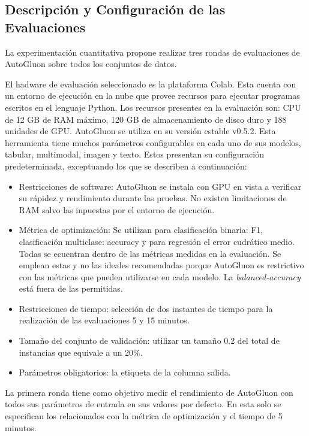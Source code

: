 \subsection{Descripción y Configuración de las Evaluaciones}\label{subsection:seetings}

La experimentación cuantitativa propone realizar tres rondas de evaluaciones de AutoGluon sobre todos los conjuntos de datos.

El hadware de evaluación seleccionado es la plataforma Colab. Esta cuenta con un entorno de ejecución en la nube que provee recursos para ejecutar programas 
escritos en el lenguaje Python. Los recursos presentes en la evaluación son: CPU de 12 GB de RAM máximo, 120 GB de almacenamiento de disco duro y 188 unidades de GPU.
AutoGluon se utiliza en su versión estable v0.5.2. Esta herramienta tiene muchos parámetros configurables en cada uno de sus modelos, tabular, multimodal, imagen y texto. 
Estos presentan su configuración predeterminada, exceptuando los que se describen a continuación:

\begin{itemize}
    \item Restricciones de software: AutoGluon se instala con GPU en vista a verificar su rápidez y rendimiento durante las pruebas. No existen limitaciones de RAM salvo
    las inpuestas por el entorno de ejecución.
    \item Métrica de optimización: Se utilizan para clasificación binaria: F1, clasificación multiclase: accuracy y para regresión el error cudrático medio. Todas se 
    ecuentran dentro de las métricas medidas en la evaluación. Se emplean estas y no las ideales recomendadas porque AutoGluon es restrictivo con las métricas que 
    pueden utilizarse en cada modelo. La \textit{balanced-accuracy} está fuera de las permitidas.
    \item Restricciones de tiempo: selección de dos instantes de tiempo para la realización de las evaluaciones 5 y 15 minutos.
    \item Tamaño del conjunto de validación: utilizar un tamaño 0.2 del total de instancias que equivale a un 20\%. 
    \item Parámetros obligatorios: la etiqueta de la columna salida.  
  \end{itemize}
  
  La primera ronda tiene como objetivo medir el rendimiento de AutoGluon con todos sus parámetros de entrada en sus valores por defecto. En esta solo se especifican los 
  relacionados con la métrica de optimización y el tiempo de 5 minutos. 
  

